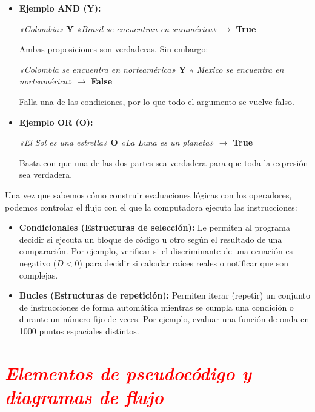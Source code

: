 \documentclass[12pt]{article}
\begin{document}
\begin{itemize}
    \item \textbf{Ejemplo AND (Y):} 
    \begin{center}
    \textit{«Colombia»} \textbf{Y} \textit{«Brasil se encuentran en suramérica»} $\longrightarrow$ \textbf{True} 
    \end{center}
    Ambas proposiciones son verdaderas. Sin embargo:
    \begin{center}
    \textit{«Colombia se encuentra en norteamérica»} \textbf{Y} \textit{« Mexico se 
    encuentra en norteamérica»} $\longrightarrow$ \textbf{False}
    \end{center}
    Falla una de las condiciones, por lo que todo el argumento se vuelve falso.

    \item \textbf{Ejemplo OR (O):}
    \begin{center}
    \textit{«El Sol es una estrella»} \textbf{O} \textit{«La Luna es un planeta»} $\longrightarrow$ \textbf{True}
    \end{center}
    Basta con que una de las dos partes sea verdadera para que toda la expresión sea verdadera.
\end{itemize}

\noindent  Una vez que sabemos cómo construir evaluaciones lógicas con los operadores, 
podemos controlar el flujo con el que la computadora ejecuta las instrucciones:

\begin{itemize}
    \item \textbf{Condicionales (Estructuras de selección):} Le permiten al programa decidir si ejecuta un bloque de código u otro según el resultado de una comparación. Por ejemplo, verificar si el discriminante de una ecuación es negativo ($D < 0$) para decidir si calcular raíces reales o notificar que son complejas.
    \item \textbf{Bucles (Estructuras de repetición):} Permiten iterar (repetir) un conjunto de instrucciones de forma automática mientras se cumpla una condición o durante un número fijo de veces. Por ejemplo, evaluar una función de onda en 1000 puntos espaciales distintos.
\end{itemize}


\section*{\textcolor{red}{\textit{Elementos de pseudocódigo y diagramas de flujo}}}
\end{document}
